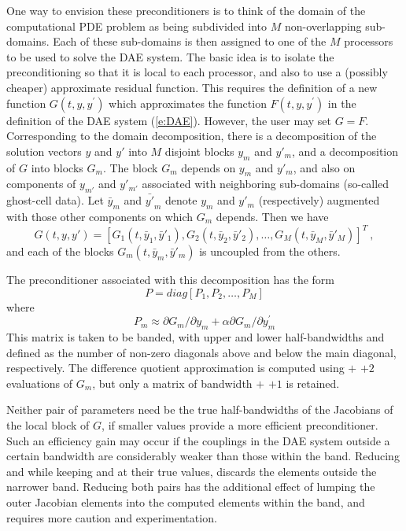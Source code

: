 {
One way to envision these preconditioners is to think of the domain of
the computational PDE problem as being subdivided into $M$ non-overlapping
sub-domains.  Each of these sub-domains is then assigned to one of the
$M$ processors to be used to solve the DAE system. The basic idea is
to isolate the preconditioning so that it is local to each processor,
and also to use a (possibly cheaper) approximate residual
function. This requires the definition of a new function $G(t,y,y^\prime)$
which approximates the function $F(t, y, y^\prime)$ in the definition of the DAE
system (\ref{e:DAE}). However, the user may set $G = F$.  Corresponding
to the domain decomposition, there is a decomposition of the solution
vectors $y$ and $y'$ into $M$ disjoint blocks $y_m$ and $y'_m$, and a
decomposition of $G$ into blocks $G_m$.  The block $G_m$ depends on $y_m$
and $y'_m$, and also on components of $y_{m'}$ and $y'_{m'}$ associated with
neighboring sub-domains (so-called ghost-cell data).  Let $\bar{y}_m$
and $\bar{y'}_m$ denote $y_m$ and $y'_m$ (respectively) augmented
with those other components on which $G_m$ depends.  Then we have
\begin{equation}
  G(t,y,y') = [G_1(t,\bar{y}_1,\bar{y}'_1), G_2(t,\bar{y}_2,\bar{y}'_2),
               \ldots, G_M(t,\bar{y}_M,\bar{y}'_M)]^T ~,
\end{equation}
and each of the blocks $G_m(t,\bar{y}_m,\bar{y}'_m)$ is uncoupled from
the others.

The preconditioner associated with this decomposition has the form 
\begin{equation}
  P= diag[P_1, P_2, \ldots, P_M]
\end{equation}
where 
\begin{equation}
  P_m \approx \partial G_m / \partial y_m
  + \alpha \partial G_m / \partial y^\prime_m
\end{equation}
This matrix is taken to be banded, with
upper and lower half-bandwidths  and  defined as
the number of non-zero diagonals above and below the main diagonal,
respectively. The difference quotient approximation is computed using
 $+$  $+ 2$ evaluations of $G_m$, but only a matrix
of bandwidth  $+$  $+ 1$ is retained.

Neither pair of parameters need be the true half-bandwidths of the Jacobians
of the local block of $G$, if smaller values provide a more efficient
preconditioner.  Such an efficiency gain may occur if the couplings
in the DAE system outside a certain bandwidth are considerably weaker than
those within the band.  Reducing  and  while keeping
 and  at their true values, discards the elements
outside the narrower band.  Reducing both pairs has the additional
effect of lumping the outer Jacobian elements into the computed elements
within the band, and requires more caution and experimentation.

}

